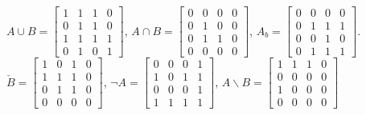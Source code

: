 \documentclass[a4paper]{article}
\begin{document}
\begin{spacing}{2.0}
	\begin{center}
	$A \cup B = \begin{bmatrix} 1 & 1 & 1 & 0 \\ 0 & 1 & 1 & 0 \\ 1 & 1 & 1 & 1\\ 0 & 1 & 0 & 1 \end{bmatrix}$, 	
	$A \cap B = \begin{bmatrix} 0 & 0 & 0 & 0 \\ 0 & 1 & 0 & 0 \\ 0 & 1 & 1 & 0\\ 0 & 0 & 0 & 0 \end{bmatrix}$, 	
	$A_b = \begin{bmatrix} 0 & 0 & 0 & 0 \\ 0 & 1 & 1 & 1 \\ 0 & 0 & 1 & 0\\ 0 & 1 & 1 & 1 \end{bmatrix}$.\\
	$\check{B} =  \begin{bmatrix} 1 & 0 & 1 & 0 \\ 1 & 1 & 1 & 0 \\ 0 & 1 & 1 & 0\\ 0 & 0 & 0 & 0 \end{bmatrix}$,
	$\neg A = \begin{bmatrix}  0 & 0 & 0 & 1 \\ 1 & 0 & 1 & 1 \\ 0 & 0 & 0 & 1\\ 1 & 1 & 1 & 1\end{bmatrix}$, 
	$A\backslash B = \begin{bmatrix} 1 & 1 & 1 & 0 \\ 0 & 0 & 0 & 0 \\ 1 & 0 & 0 & 0\\ 0 & 0 & 0 & 0\end{bmatrix}$\\
	\end{center}
	

\end{spacing}
\end{document}

